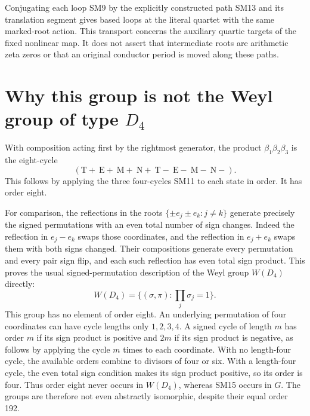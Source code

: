 Conjugating each loop SM9 by the explicitly constructed path
SM13 and its translation segment gives based loops at the literal
quartet with the same marked-root action. This transport concerns
the auxiliary quartic targets of the fixed nonlinear map. It does
not assert that intermediate roots are arithmetic zeta zeros or
that an original conductor period is moved along these paths.

\section{Why this group is not the Weyl group of type $D_4$}
With composition acting first by the rightmost generator, the
product $\beta_1\beta_2\beta_3$ is the eight-cycle
\begin{equation}
 (\mathrm T+\ \mathrm E+\ \mathrm M+\ \mathrm N+\
   \mathrm T-\ \mathrm E-\ \mathrm M-\ \mathrm N-).
 \tag{SM15}
\end{equation}
This follows by applying the three four-cycles SM11 to each
state in order. It has order eight.

For comparison, the reflections in the roots
$\{\pm e_j\pm e_k:j\ne k\}$ generate precisely the signed
permutations with an even total number of sign changes. Indeed
the reflection in $e_j-e_k$ swaps those coordinates, and the
reflection in $e_j+e_k$ swaps them with both signs changed.
Their compositions generate every permutation and every pair
sign flip, and each such reflection has even total sign product.
This proves the usual signed-permutation description of the
Weyl group $W(D_4)$ directly:
\[
 W(D_4)=\{(\sigma,\pi):\prod_j\sigma_j=1\}.
\]
This group has no element of order eight. An underlying
permutation of four coordinates can have cycle lengths only
$1,2,3,4$. A signed cycle of length $m$ has order $m$ if its
sign product is positive and $2m$ if its sign product is
negative, as follows by applying the cycle $m$ times to each
coordinate. With no length-four cycle, the available orders
combine to divisors of four or six. With a length-four cycle,
the even total sign condition makes its sign product positive,
so its order is four. Thus order eight never occurs in $W(D_4)$,
whereas SM15 occurs in $G$. The groups are therefore not even
abstractly isomorphic, despite their equal order 192.

